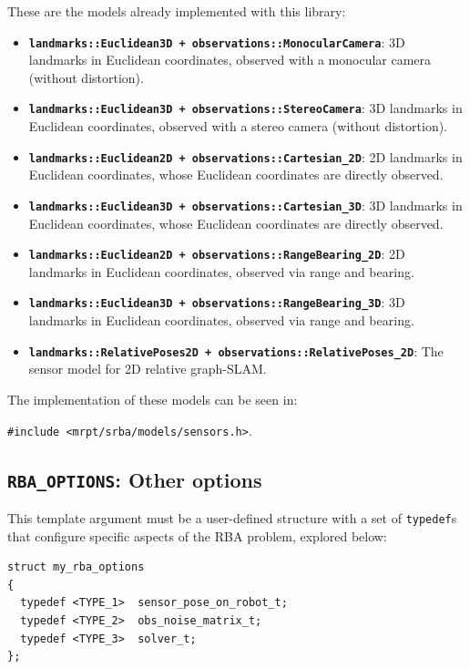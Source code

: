 \documentclass[a4paper,11pt]{article}
\begin{document}
These are the models already implemented with this library: 

\begin{itemize}
\item{\textbf{ \texttt{landmarks::Euclidean3D + observations::MonocularCamera}}: 3D landmarks in Euclidean coordinates, observed 
with a monocular camera (without distortion).}
\item{\textbf{ \texttt{landmarks::Euclidean3D + observations::StereoCamera}}: 3D landmarks in Euclidean coordinates, observed 
with a stereo camera (without distortion).}
\item{\textbf{ \texttt{landmarks::Euclidean2D + observations::Cartesian\_2D}}: 2D landmarks in Euclidean coordinates, whose
Euclidean coordinates are directly observed.}
\item{\textbf{ \texttt{landmarks::Euclidean3D + observations::Cartesian\_3D}}: 3D landmarks in Euclidean coordinates, whose
Euclidean coordinates are directly observed.}
\item{\textbf{ \texttt{landmarks::Euclidean2D + observations::RangeBearing\_2D}}: 2D landmarks in Euclidean coordinates, observed
via range and bearing.}
\item{\textbf{ \texttt{landmarks::Euclidean3D + observations::RangeBearing\_3D}}: 3D landmarks in Euclidean coordinates, observed
via range and bearing.}
\item{\textbf{ \texttt{landmarks::RelativePoses2D + observations::RelativePoses\_2D}}: The sensor model for 2D relative graph-SLAM.}
\end{itemize}

The implementation of these models can be seen in:

\texttt{\#include <mrpt/srba/models/sensors.h>}.


\subsection{\texttt{RBA\_OPTIONS}: Other options}
\label{sect:rba_options}

This template argument must be a user-defined structure with a set of \texttt{typedef}s 
that configure specific aspects of the RBA problem, explored below:

\begin{lstlisting}
struct my_rba_options
{
  typedef <TYPE_1>  sensor_pose_on_robot_t;
  typedef <TYPE_2>  obs_noise_matrix_t;
  typedef <TYPE_3>  solver_t;
};
\end{lstlisting}
\end{document}
